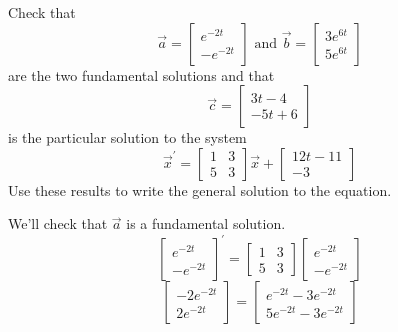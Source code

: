 \begin{example}
	Check that 
	\begin{equation*}
		\vec{a} = \begin{bmatrix}
			e^{-2t} \\
			-e^{-2t}
		\end{bmatrix} \text{ and } \vec{b} = \begin{bmatrix}
			3e^{6t} \\
			5e^{6t}
		\end{bmatrix}
	\end{equation*} 
	are the two fundamental solutions and that
	\begin{equation*}
		\vec{c} = \begin{bmatrix}
			3t - 4 \\
			-5t + 6
		\end{bmatrix}
	\end{equation*}
	is the particular solution to the system
	\begin{equation*}
		\vec{x}^\prime = \begin{bmatrix}
			1 & 3 \\
			5 & 3
		\end{bmatrix} \vec{x} + \begin{bmatrix}
			12t - 11 \\
			-3
		\end{bmatrix}
	\end{equation*}
	Use these results to write the general solution to the equation.
\end{example}
\noindent
We'll check that $\vec{a}$ is a fundamental solution.
\begin{equation*}
	\begin{bmatrix}
		e^{-2t} \\
		-e^{-2t}
	\end{bmatrix}^\prime = \begin{bmatrix}
		1 & 3 \\
		5 & 3
	\end{bmatrix} \begin{bmatrix}
		e^{-2t} \\
		-e^{-2t}
	\end{bmatrix}
\end{equation*}
\begin{equation*}
	\begin{bmatrix}
		-2e^{-2t} \\
		2e^{-2t}
	\end{bmatrix} = \begin{bmatrix}
		e^{-2t} - 3e^{-2t} \\
		5e^{-2t} - 3e^{-2t}
	\end{bmatrix}
\end{equation*}
